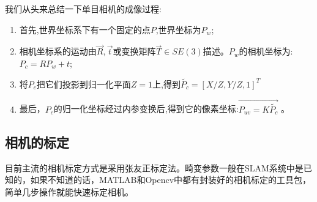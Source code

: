 我们从头来总结一下单目相机的成像过程:
\begin{enumerate}
\item 首先,世界坐标系下有一个固定的点$P$,世界坐标为$P_w$;
\item 相机坐标系的运动由$\vec{R},\vec{t}$或变换矩阵$\vec{T} \in SE(3)$描述。$P_w$的相机坐标为:$P_{c}=R P_{w}+t$;
\item 将$P_c$把它们投影到归一化平面$Z=1$上,得到$\tilde{P_c}=[X / Z, Y / Z, 1]^{T}$
\item 最后，$P_c$的归一化坐标经过内参变换后,得到它的像素坐标:$\vec{P_{uv}=K\tilde{P_c}}$ 。
\end{enumerate}\par
\subsection{相机的标定}
目前主流的相机标定方式是采用张友正标定法\cite{zhang1999flexible}。畸变参数一般在SLAM系统中是已知的，如果不知道的话，MATLAB和Opencv中都有封装好的相机标定的工具包，简单几步操作就能快速标定相机。